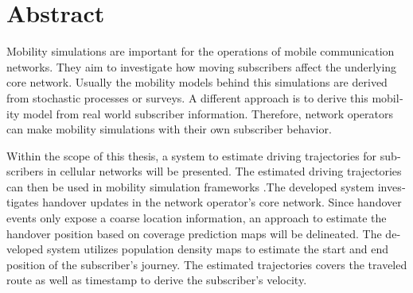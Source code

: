 \chapter{Abstract}

\begin{english} %
Mobility simulations are important for the operations of mobile communication networks. They aim to investigate how moving subscribers affect the underlying core network. Usually the mobility models behind this simulations are derived from stochastic processes or surveys. A different approach is to derive this mobility model from real world subscriber information. Therefore, network operators can make mobility simulations with their own subscriber behavior.

Within the scope of this thesis, a system to estimate driving trajectories for subscribers in cellular networks will be presented. The estimated driving trajectories can then be used in mobility simulation frameworks .The developed system investigates handover updates in the network operator’s core network. Since handover events only expose a coarse location information, an approach to estimate the handover position based on coverage prediction maps will be delineated. The developed system utilizes population density maps to estimate the start and end position of the subscriber’s journey. The estimated trajectories covers the traveled route as well as timestamp to derive the subscriber’s velocity.
\end{english}
